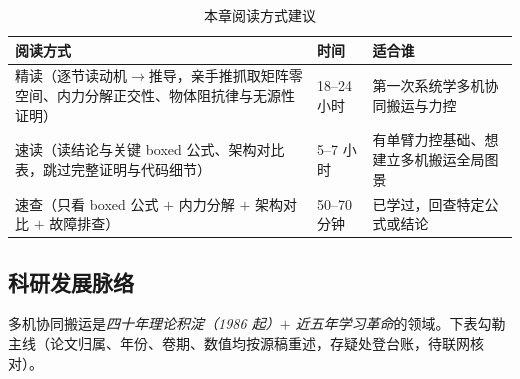 \begin{table}[H]\centering\small
\caption{本章阅读方式建议}
\label{tab:cm-reading}
\begin{tabular}{lll}
\toprule
阅读方式 & 时间 & 适合谁 \\
\midrule
精读（逐节读动机$\to$推导，亲手推抓取矩阵零空间、内力分解正交性、物体阻抗律与无源性证明） & 18--24 小时 & 第一次系统学多机协同搬运与力控 \\
速读（读结论与关键 boxed 公式、架构对比表，跳过完整证明与代码细节） & 5--7 小时 & 有单臂力控基础、想建立多机搬运全局图景 \\
速查（只看 boxed 公式 $+$ 内力分解 $+$ 架构对比 $+$ 故障排查） & 50--70 分钟 & 已学过，回查特定公式或结论 \\
\bottomrule
\end{tabular}
\end{table}

\subsection*{科研发展脉络}
多机协同搬运是\emph{四十年理论积淀（1986 起）$+$ 近五年学习革命}的领域。下表勾勒主线（论文归属、年份、卷期、数值均按源稿重述，存疑处登台账，待联网核对）。

